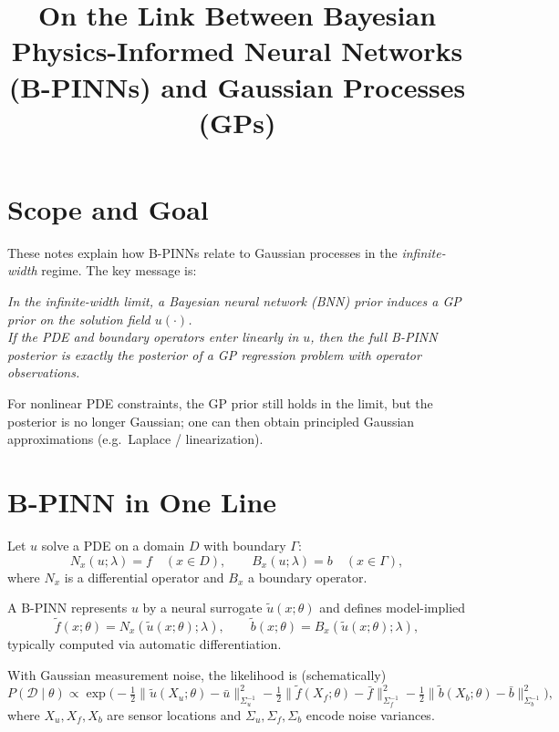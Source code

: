 \documentclass[11pt]{article}
\title{On the Link Between Bayesian Physics-Informed Neural Networks (B-PINNs) and Gaussian Processes (GPs)}
\author{}
\date{}
\begin{document}
\maketitle

\section*{Scope and Goal}

These notes explain how B-PINNs relate to Gaussian processes in the \emph{infinite-width} regime.
The key message is:

\begin{center}
\emph{In the infinite-width limit, a Bayesian neural network (BNN) prior induces a GP prior on the solution field $u(\cdot)$.\\
If the PDE and boundary operators enter linearly in $u$, then the full B-PINN posterior is exactly the posterior of a GP regression problem with operator observations.}
\end{center}

For nonlinear PDE constraints, the GP prior still holds in the limit, but the posterior is no longer Gaussian; one can then obtain principled Gaussian approximations (e.g.\ Laplace / linearization).

\section{B-PINN in One Line}

Let $u$ solve a PDE on a domain $D$ with boundary $\Gamma$:
\begin{equation}
N_x(u;\lambda)=f \quad (x\in D),\qquad B_x(u;\lambda)=b \quad (x\in \Gamma),
\end{equation}
where $N_x$ is a differential operator and $B_x$ a boundary operator.

A B-PINN represents $u$ by a neural surrogate $\tilde u(x;\theta)$ and defines model-implied
\begin{equation}
\tilde f(x;\theta)=N_x(\tilde u(x;\theta);\lambda),\qquad \tilde b(x;\theta)=B_x(\tilde u(x;\theta);\lambda),
\end{equation}
typically computed via automatic differentiation.

With Gaussian measurement noise, the likelihood is (schematically)
\begin{equation}
P(\mathcal D\mid \theta)\propto \exp\!\Big(
-\tfrac12\| \tilde u(X_u;\theta)-\bar u\|_{\Sigma_u^{-1}}^2
-\tfrac12\| \tilde f(X_f;\theta)-\bar f\|_{\Sigma_f^{-1}}^2
-\tfrac12\| \tilde b(X_b;\theta)-\bar b\|_{\Sigma_b^{-1}}^2
\Big),
\end{equation}
where $X_u,X_f,X_b$ are sensor locations and $\Sigma_u,\Sigma_f,\Sigma_b$ encode noise variances.
\end{document}
